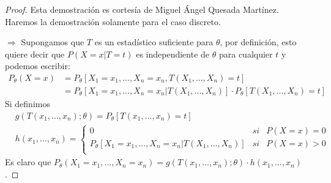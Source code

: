 \begin{proof}
    Esta demostración es cortesía de Miguel Ángel Quesada Martínez. Haremos la demostración solamente para el caso discreto.

    $\boxed{\Longrightarrow}$ Supongamos que $T$ es un estadístico suficiente para $\theta$, por definición, esto quiere decir que $P(X = x | T = t)$ es independiente de $\theta$ para cualquier $t$ y podemos escribir:
    \begin{align*}
        P_{\theta}(X = x) & = P_{\theta}[X_1 = x_1,...,X_n = x_n , T(X_1,...,X_n) = t]                                    \\
                          & = P_{\theta}[X_1 = x_1,...,X_n = x_n | T(X_1,...,X_n)]  \cdot P_{\theta}[ T(X_1,...,X_n) = t]
    \end{align*}
    Si definimos
    \begin{align*}
         & g(T(x_1,...,x_n);\theta) = P_{\theta}[T(x_1,...,x_n) = t]                                         \\
         & h(x_1,...,x_n) = \left\{ \begin{array}{lcc}
                                        0                                                    & si & P(X = x) = 0 \\
                                        P_{\theta}[X_1 = x_1,...,X_n = x_n | T(X_1,...,X_n)] & si & P(X = x) > 0 \\
                                    \end{array}
        \right.
    \end{align*}
    Es claro que $P_{\theta}(X_1 = x_1,...,X_n = x_n) = g(T(x_1,...,x_n);\theta) \cdot h(x_1,...,x_n)$.


\end{proof}
